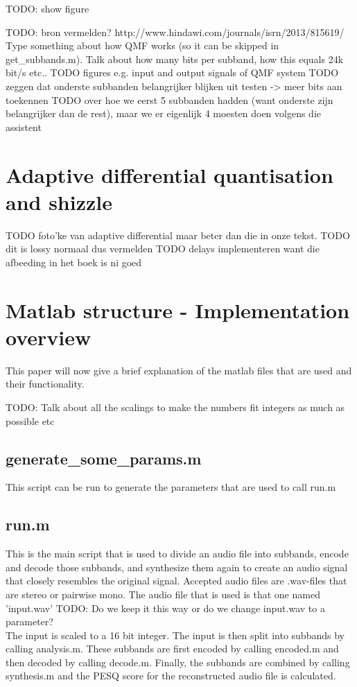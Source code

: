 \documentclass[a4paper]{article}
\begin{document}
TODO: show figure

TODO: bron vermelden? http://www.hindawi.com/journals/isrn/2013/815619/
Type something about how QMF works (so it can be skipped in get\_subbands.m). Talk about how many bits per subband, how this equals 24k bit/s etc..
TODO figures e.g. input and output signals of QMF system
TODO zeggen dat onderste subbanden belangrijker blijken uit testen -> meer bits aan toekennen
TODO over hoe we eerst 5 subbanden hadden (want onderste zijn belangrijker dan de rest), maar we er eigenlijk 4 moesten doen volgens die assistent

\section{Adaptive differential quantisation and shizzle}
TODO foto'ke van adaptive differential maar beter dan die in onze tekst.
TODO dit is lossy normaal dus vermelden
TODO delays implementeren want die afbeeding in het boek is ni goed 

\section{Matlab structure - Implementation overview}
This paper will now give a brief explanation of the matlab files that are used and their functionality.

TODO: Talk about all the scalings to make the numbers fit integers as much as possible etc

\subsection{generate\_some\_params.m}
This script can be run to generate the parameters that are used to call run.m

\subsection{run.m}
This is the main script that is used to divide an audio file into subbands, encode and decode those subbands, and synthesize them again to create an audio signal that closely resembles the original signal. Accepted audio files are .wav-files that are stereo or pairwise mono. The audio file that is used is that one named 'input.wav' TODO: Do we keep it this way or do we change input.wav to a parameter? 
\\
The input is scaled to a 16 bit integer. The input is then split into subbands by calling analysis.m. These subbands are first encoded by calling encoded.m and then decoded by calling decode.m. Finally, the subbands are combined by calling synthesis.m and the PESQ score for the reconstructed audio file is calculated.
\end{document}
